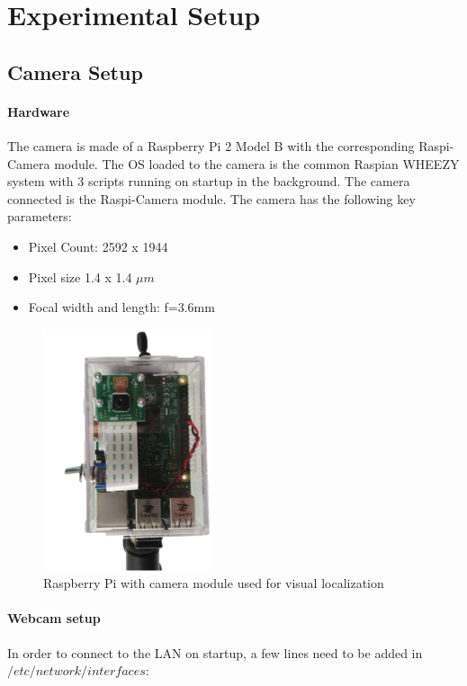 \newpage
\section{Experimental Setup}

\subsection{Camera Setup}

\paragraph{Hardware} The camera is made of a Raspberry Pi 2 Model B with the corresponding Raspi-Camera module. The OS loaded to the camera is the common Raspian WHEEZY system with 3 scripts running on startup in the background. The camera connected is the Raspi-Camera module.
The camera has the following key parameters: \cite{RaspiDoc}
\begin{itemize}
    \item Pixel Count: 2592 x 1944
    \item Pixel size 1.4 x 1.4 $\mu m$
    \item Focal width and length: f=3.6mm
\end{itemize}

\begin{figure}[H]
    \centering
    \includegraphics[width=0.3\linewidth]{files/RaspiCam.png}
    \caption{Raspberry Pi with camera module used for visual localization}
    \label{fig:camera}
\end{figure}


\paragraph{Webcam setup} In order to connect to the LAN on startup, a few lines need to be added in $/etc/network/interfaces$: 

